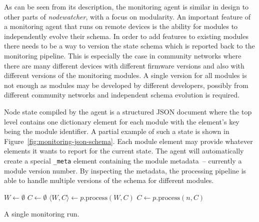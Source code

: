 \documentclass[5p,sort&compress]{elsarticle}
\newcommand{\nodewatcher}{\textit{nodewatcher}}
\begin{document}
As can be seen from its description, the monitoring agent is similar in design to other parts of \nodewatcher{}, with a focus on modularity.
An important feature of a monitoring agent that runs on remote devices is the ability for modules to independently evolve their schema.
In order to add features to existing modules there needs to be a way to version the state schema which is reported back to the monitoring pipeline.
This is especially the case in community networks where there are many different devices with different firmware versions and also with different versions of the monitoring modules.
A single version for all modules is not enough as modules may be developed by different developers, possibly from different community networks and independent schema evolution is required.

Node state compiled by the agent is a structured JSON document where the top level contains one dictionary element for each module with the element's key being the module identifier.
A partial example of such a state is shown in Figure~\ref{fig:monitoring-json-schema}.
Each module element may provide whatever elements it wants to report for the current state.
The agent will automatically create a special \texttt{\_meta} element containing the module metadata~-- currently a module version number.
By inspecting the metadata, the processing pipeline is able to handle multiple versions of the schema for different modules.

\begin{algorithm}[t]
\begin{algorithmic}
  \State $W \gets \emptyset$
  \State $C \gets \emptyset$
      \State $\langle W, C \rangle \gets p.\mathrm{process}(W, C)$
        \State $C \gets p.\mathrm{process}(n, C)$
      \EndFor
    \EndIf
  \EndFor
\EndProcedure
\end{algorithmic}
\caption{A single monitoring run.}
\label{alg:monitoring-pipeline}
\end{algorithm}
\end{document}
